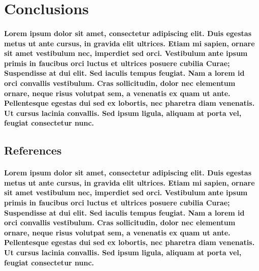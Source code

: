\documentclass[11pt, twocolumn]{article}
\begin{document}
\section{Conclusions}
\paragraph{Lorem ipsum dolor sit amet, consectetur adipiscing elit. Duis egestas metus ut ante cursus, in gravida elit ultrices. Etiam mi sapien, ornare sit amet vestibulum nec, imperdiet sed orci. Vestibulum ante ipsum primis in faucibus orci luctus et ultrices posuere cubilia Curae; Suspendisse at dui elit. Sed iaculis tempus feugiat. Nam a lorem id orci convallis vestibulum. Cras sollicitudin, dolor nec elementum ornare, neque risus volutpat sem, a venenatis ex quam ut ante. Pellentesque egestas dui sed ex lobortis, nec pharetra diam venenatis. Ut cursus lacinia convallis. Sed ipsum ligula, aliquam at porta vel, feugiat consectetur nunc.}

\subsection{References}
\paragraph{Lorem ipsum dolor sit amet, consectetur adipiscing elit. Duis egestas metus ut ante cursus, in gravida elit ultrices. Etiam mi sapien, ornare sit amet vestibulum nec, imperdiet sed orci. Vestibulum ante ipsum primis in faucibus orci luctus et ultrices posuere cubilia Curae; Suspendisse at dui elit. Sed iaculis tempus feugiat. Nam a lorem id orci convallis vestibulum. Cras sollicitudin, dolor nec elementum ornare, neque risus volutpat sem, a venenatis ex quam ut ante. Pellentesque egestas dui sed ex lobortis, nec pharetra diam venenatis. Ut cursus lacinia convallis. Sed ipsum ligula, aliquam at porta vel, feugiat consectetur nunc.}
\end{document}
